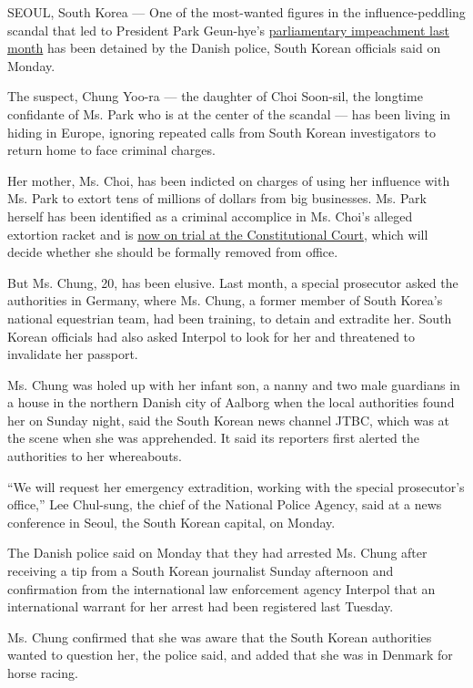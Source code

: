 SEOUL, South Korea --- One of the most-wanted figures in the
influence-peddling scandal that led to President Park Geun-hye's
\href{http://www.nytimes3xbfgragh.onion/2016/12/09/world/asia/south-korea-president-park-geun-hye-impeached.html}{parliamentary
impeachment last month} has been detained by the Danish police, South
Korean officials said on Monday.

The suspect, Chung Yoo-ra --- the daughter of Choi Soon-sil, the
longtime confidante of Ms. Park who is at the center of the scandal ---
has been living in hiding in Europe, ignoring repeated calls from South
Korean investigators to return home to face criminal charges.

Her mother, Ms. Choi, has been indicted on charges of using her
influence with Ms. Park to extort tens of millions of dollars from big
businesses. Ms. Park herself has been identified as a criminal
accomplice in Ms. Choi's alleged extortion racket and is
\href{http://www.nytimes3xbfgragh.onion/2016/12/22/world/asia/south-korea-president-park-impeachment.html?_r=0}{now
on trial at the Constitutional Court}, which will decide whether she
should be formally removed from office.

But Ms. Chung, 20, has been elusive. Last month, a special prosecutor
asked the authorities in Germany, where Ms. Chung, a former member of
South Korea's national equestrian team, had been training, to detain and
extradite her. South Korean officials had also asked Interpol to look
for her and threatened to invalidate her passport.

Ms. Chung was holed up with her infant son, a nanny and two male
guardians in a house in the northern Danish city of Aalborg when the
local authorities found her on Sunday night, said the South Korean news
channel JTBC, which was at the scene when she was apprehended. It said
its reporters first alerted the authorities to her whereabouts.

``We will request her emergency extradition, working with the special
prosecutor's office,'' Lee Chul-sung, the chief of the National Police
Agency, said at a news conference in Seoul, the South Korean capital, on
Monday.

The Danish police said on Monday that they had arrested Ms. Chung after
receiving a tip from a South Korean journalist Sunday afternoon and
confirmation from the international law enforcement agency Interpol that
an international warrant for her arrest had been registered last
Tuesday.

Ms. Chung confirmed that she was aware that the South Korean authorities
wanted to question her, the police said, and added that she was in
Denmark for horse racing.


